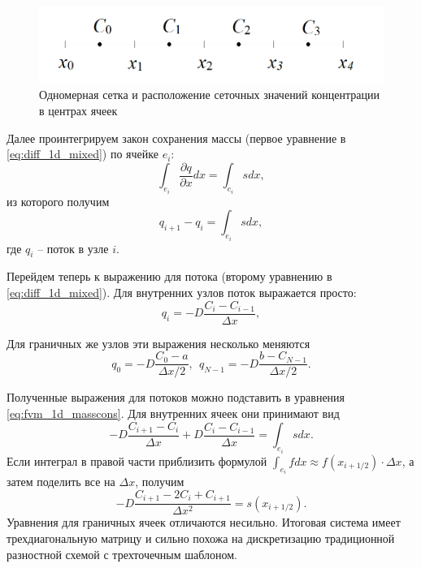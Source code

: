 \documentclass[a4paper, 11pt]{article}
\begin{document}
\begin{figure}[h] \centering
	\includegraphics[scale=0.4]{fvm_1d}
	\caption{Одномерная сетка и расположение сеточных значений концентрации в центрах ячеек\label{pic:fvm_1d}}
\end{figure}

Далее проинтегрируем закон сохранения массы (первое уравнение в \eqref{eq:diff_1d_mixed}) по ячейке $e_i$:
\begin{equation}
\int_{e_i}
\frac{\partial q}{\partial x}dx = \int_{e_i}sdx,
\end{equation}
из которого получим
\begin{equation}\label{eq:fvm_1d_masscons}
q_{i+1} - q_i = \int_{e_i}sdx,
\end{equation}
где $q_i$ -- поток в узле $i$. 

Перейдем теперь к выражению для потока (второму уравнению в  \eqref{eq:diff_1d_mixed}). Для внутренних узлов поток выражается просто:
\begin{equation}
q_i = -D\frac{C_i - C_{i-1}}{\Delta x},
\end{equation}

Для граничных же узлов эти выражения несколько меняются
\begin{equation}
q_0 = -D\frac{C_0 - a}{\Delta x /2},~~q_{N-1} = -D\frac{b - C_{N-1}}{\Delta x/2}.
\end{equation}

Полученные выражения для потоков можно подставить в уравнения \eqref{eq:fvm_1d_masscons}. Для внутренних ячеек они принимают вид
\begin{equation}
-D\frac{C_{i+1} - C_{i}}{\Delta x} + D\frac{C_i - C_{i-1}}{\Delta x} = \int_{e_i}sdx.
\end{equation}
Если интеграл в правой части приблизить формулой $\int_{e_i}fdx \approx f(x_{i+1/2}) \cdot\Delta x$, а затем поделить все на $\Delta x$, получим
\begin{equation}
-D\frac{C_{i+1} - 2C_{i} + C_{i+1}}{\Delta x^2} = s(x_{i+1/2}).
\end{equation}
Уравнения для граничных ячеек отличаются несильно. Итоговая система имеет трехдиагональную матрицу и сильно похожа на дискретизацию традиционной разностной схемой с трехточечным шаблоном.
\end{document}

